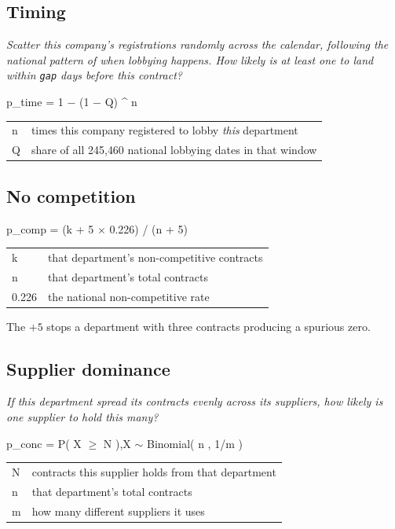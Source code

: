 \documentclass[11pt,a4paper]{article}
\begin{document}
\subsection*{Timing}
\emph{Scatter this company's registrations randomly across the calendar, following the
national pattern of when lobbying happens. How likely is at least one to land within
\texttt{gap} days before this contract?}

\begin{center}\ttfamily\small
p\_time = 1 $-$ (1 $-$ Q) \^{} n\\[3pt]
\normalfont\rmfamily
\begin{tabular}{@{}ll@{}}
n & times this company registered to lobby \emph{this} department \\
Q & share of all 245{,}460 national lobbying dates in that window \\
\end{tabular}
\end{center}

\subsection*{No competition}
\begin{center}\ttfamily\small
p\_comp = (k + 5 $\times$ 0.226) / (n + 5)\\[3pt]
\normalfont\rmfamily
\begin{tabular}{@{}ll@{}}
k & that department's non-competitive contracts \\
n & that department's total contracts \\
0.226 & the national non-competitive rate \\
\end{tabular}
\end{center}
The $+5$ stops a department with three contracts producing a spurious zero.

\subsection*{Supplier dominance}
\emph{If this department spread its contracts evenly across its suppliers, how likely is
one supplier to hold this many?}
\begin{center}\ttfamily\small
p\_conc = P( X $\ge$ N ),\quad X $\sim$ Binomial( n , 1/m )\\[3pt]
\normalfont\rmfamily
\begin{tabular}{@{}ll@{}}
N & contracts this supplier holds from that department \\
n & that department's total contracts \\
m & how many different suppliers it uses \\
\end{tabular}
\end{center}
\end{document}
